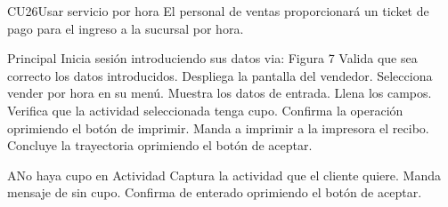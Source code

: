 

\begin{UseCase}{CU26}{Usar servicio por hora}{
		El personal de ventas proporcionará un ticket de pago para el ingreso a la sucursal por hora.
	}
\end{UseCase}
\begin{UCtrayectoria}{Principal}
	\UCpaso Inicia sesión introduciendo sus datos via: Figura 7
	\UCpaso[\UCactor] Valida que sea correcto los datos introducidos.
	\UCpaso[\UCactor] Despliega la pantalla del vendedor.
	\UCpaso Selecciona vender por hora en su menú.
	\UCpaso[\UCactor] Muestra los datos de entrada.
	\UCpaso Llena los campos.
	\UCpaso[\UCactor] Verifica que la actividad seleccionada tenga cupo.
	\UCpaso Confirma la operación oprimiendo el botón de imprimir.
	\UCpaso[\UCactor] Manda a imprimir a la impresora el recibo.
	\UCpaso Concluye la trayectoria oprimiendo el botón de aceptar.
	
\end{UCtrayectoria}

\begin{UCtrayectoriaA}{A}{No haya cupo en Actividad}
	\UCpaso Captura la actividad que el cliente quiere.
	\UCpaso[\UCactor] Manda mensaje de sin cupo.
	\UCpaso Confirma de enterado oprimiendo el botón de aceptar.
	\end{UCtrayectoriaA}
